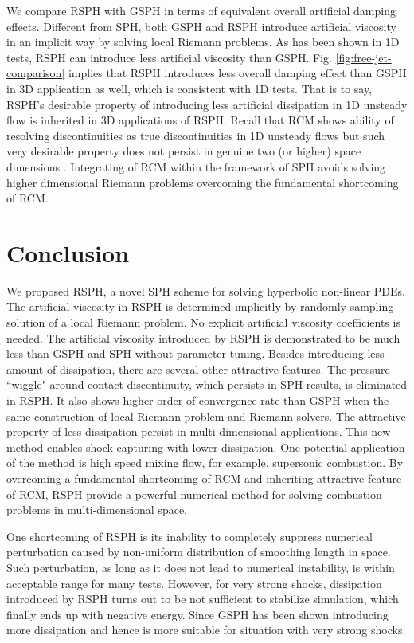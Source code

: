 We compare RSPH with GSPH in terms of equivalent overall artificial damping effects. Different from SPH, both GSPH and RSPH introduce artificial viscosity in an implicit way by solving local Riemann problems. As has been shown in 1D tests, RSPH can introduce less artificial viscosity than GSPH. Fig. \ref{fig:free-jet-comparison} implies that RSPH introduces less overall damping effect than GSPH in 3D application as well, which is consistent with 1D tests. That is to say, RSPH's desirable property of introducing less artificial dissipation in 1D unsteady flow is inherited in 3D applications of RSPH. Recall that RCM shows ability of resolving discontinuities as true discontinuities in 1D unsteady flows but such very desirable property does not persist in genuine two (or higher) space dimensions \citep{colella1982glimm}. Integrating of RCM within the framework of SPH avoids solving higher dimensional Riemann problems overcoming the fundamental shortcoming of RCM.

\section{Conclusion}
We proposed RSPH, a novel SPH scheme for solving hyperbolic non-linear PDEs. The artificial viscosity in RSPH is determined implicitly by randomly sampling solution of a local Riemann problem. No explicit artificial viscosity coefficients is needed. The artificial viscosity introduced by RSPH is demonstrated to be much less than GSPH and SPH without parameter tuning. Besides introducing less amount of dissipation, there are several other attractive features. The pressure ``wiggle" around contact discontinuity, which persists in SPH results, is eliminated in RSPH. It also shows higher order of convergence rate than GSPH when the same construction of local Riemann problem and Riemann solvers. The attractive property of less dissipation persist in multi-dimensional applications.
This new method enables shock capturing with lower dissipation. One potential application of the method is high speed mixing flow, for example, supersonic combustion.
By overcoming a fundamental shortcoming of RCM and inheriting attractive feature of RCM, RSPH provide a powerful numerical method for solving combustion problems in multi-dimensional space.

One shortcoming of RSPH is its inability to completely suppress numerical perturbation caused by non-uniform distribution of smoothing length in space. Such perturbation, as long as it does not lead to numerical instability, is within acceptable range for many tests. However, for very strong shocks, dissipation introduced by RSPH turns out to be not sufficient to stabilize simulation, which finally ends up with negative energy. Since GSPH has been shown introducing more dissipation and hence is more suitable for situation with very strong shocks.

